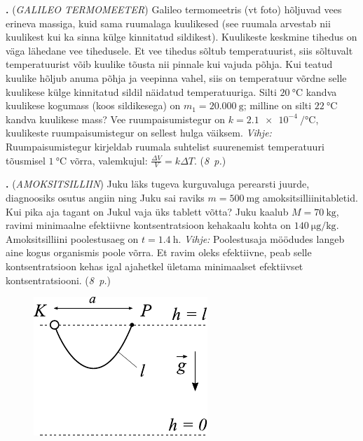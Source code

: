 \documentclass[11pt,a5paper]{article}
\newcommand{\numb}[1]{\vspace{5pt}\textbf{\large #1}}
\newcommand{\nimi}[1]{(\textsl{\small #1})}
\newcommand{\punktid}[1]{(\emph{#1~p.})}
\newcounter{ylesanne}
\newcommand{\yl}[1]{\addtocounter{ylesanne}{1}\numb{\theylesanne.} \nimi{#1} \newblock{}}
\newcommand{\autor}[1]{}%
\begin{document}
\yl{GALILEO TERMOMEETER} Galileo termomeetris (vt foto) hõljuvad vees erineva massiga, kuid sama ruumalaga kuulikesed (see ruumala arvestab nii kuulikest kui ka sinna külge kinnitatud sildikest). Kuulikeste keskmine tihedus on väga lähedane vee tihedusele. Et vee tihedus sõltub temperatuurist, siis sõltuvalt temperatuurist võib kuulike tõusta nii pinnale kui vajuda põhja. Kui teatud kuulike hõljub anuma põhja ja veepinna vahel, siis on temperatuur võrdne selle kuulikese külge kinnitatud sildil näidatud temperatuuriga. Silti $\SI{20}\celsius$ kandva kuulikese kogumass (koos sildikesega) on $m_1=\SI{20.000}{\g}$; milline on silti $\SI{22}\celsius$ kandva kuulikese mass? Vee ruumpaisumistegur on $k=\SI{2.1e-4}{\per\celsius}$, kuulikeste ruumpaisumistegur on sellest hulga väiksem. \textit{Vihje:} Ruumpaisumistegur kirjeldab ruumala suhtelist suurenemist temperatuuri tõusmisel $\SI{1}{\celsius}$ võrra, valemkujul: $\frac{\Delta V}{V} = k\Delta T$.
\punktid{8} \autor{Jaan Kalda}

\yl{AMOKSITSILLIIN} Juku läks tugeva kurguvaluga perearsti juurde, diagnoosiks osutus angiin ning Juku sai raviks $m= \SI{500}{\milli\gram}$ amoksitsilliinitabletid. Kui pika aja tagant on Jukul vaja üks tablett võtta? Juku kaalub $M= \SI{70}{\kilo\gram}$, ravimi minimaalne efektiivne kontsentratsioon kehakaalu kohta on $\SI{140}{\ug\per\kg}$. Amoksitsilliini poolestusaeg on $t= \SI{1.4}{\hour}$. \textit{Vihje:} Poolestusaja möödudes langeb aine kogus organismis poole võrra. Et ravim oleks efektiivne, peab selle kontsentratsioon kehas igal ajahetkel ületama minimaalset efektiivset kontsentratsiooni.
\punktid{8} \autor{Marten Rannut}

\begin{figure}
\vspace{-20pt}
  \begin{center}
    \includegraphics[width=1\linewidth]{me_noor_ajutine.pdf}
  \end{center}
  \vspace{-15pt}
\end{figure}
\end{document}
